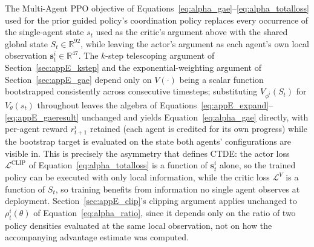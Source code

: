 The Multi-Agent PPO objective of Equations~\eqref{eq:alpha_gae}--\eqref{eq:alpha_totalloss} used for
the prior guided policy's coordination policy replaces every occurrence of the single-agent state $s_t$ used as the
critic's argument above with the shared global state $S_t \in \mathbb{R}^{92}$, while leaving the
actor's argument as each agent's own local observation $\mathbf{s}_t^i \in \mathbb{R}^{47}$. The
$k$-step telescoping argument of Section~\ref{sec:appE_kstep} and the exponential-weighting argument
of Section~\ref{sec:appE_gae} depend only on $V(\cdot)$ being a scalar function bootstrapped
consistently across consecutive timesteps; substituting $V_{\phi^i}(S_t)$ for $V_\theta(s_t)$
throughout leaves the algebra of Equations~\eqref{eq:appE_expand}--\eqref{eq:appE_gaeresult}
unchanged and yields Equation~\eqref{eq:alpha_gae} directly, with per-agent reward $r_{t+1}^i$
retained (each agent is credited for its own progress) while the bootstrap target is evaluated on the
state both agents' configurations are visible in. This is precisely the asymmetry that defines CTDE:
the actor loss $\mathcal{L}^{\text{CLIP}}$ of Equation~\eqref{eq:alpha_totalloss} is a function of
$\mathbf{s}_t^i$ alone, so the trained policy can be executed with only local information, while the
critic loss $\mathcal{L}^V$ is a function of $S_t$, so training benefits from information no single
agent observes at deployment. Section~\ref{sec:appE_clip}'s clipping argument applies unchanged to
$\rho_t^i(\theta)$ of Equation~\eqref{eq:alpha_ratio}, since it depends only on the ratio of two
policy densities evaluated at the same local observation, not on how the accompanying advantage
estimate was computed.


